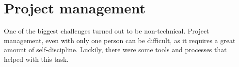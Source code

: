\section{Project management}\label{sec:project-management}

One of the biggest challenges turned out to be non-technical.
Project management,
even with only one person can be difficult,
as it requires a great amount of self-discipline.
Luckily, there were some tools and processes that helped with this task.




